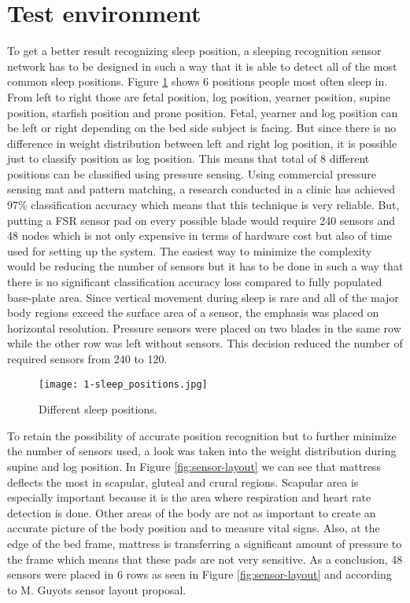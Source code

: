 \section{Test environment}
\label{ssec:test_environment}

To get a better result recognizing sleep position, a sleeping recognition sensor network has to be designed in such a way that it is able to detect all of the most common sleep positions. Figure \ref{fig:sleep_positions} shows 6 positions people most often sleep in. From left to right those are fetal position, log position, yearner position, supine position, starfish position and prone position. Fetal, yearner and log position can be left or right depending on the bed side subject is facing. But since there is no difference in weight distribution between left and right log position, it is possible just to classify position as log position. This means that total of 8 different positions can be classified using pressure sensing. Using commercial pressure sensing mat and pattern matching, a research conducted in a clinic has achieved 97\% classification accuracy\cite{postures} which means that this technique is very reliable. But, putting a \ac{FSR} sensor pad on every possible blade would require 240 sensors and 48 nodes which is not only expensive in terms of hardware cost but also of time used for setting up the system. The easiest way to minimize the complexity would be reducing the number of sensors but it has to be done in such a way that there is no significant classification accuracy loss compared to fully populated base-plate area. Since vertical movement during sleep is rare and all of the major body regions exceed the surface area of a sensor, the emphasis was placed on horizontal resolution. Pressure sensors were placed on two blades in the same row while the other row was left without sensors. This decision reduced the number of required sensors from 240 to 120.

\begin{figure}[h]
  \begin{center}
    \texttt{[image: 1-sleep\_positions.jpg]}
  \end{center}
  \caption{Different sleep positions.}
  \label{fig:sleep_positions}
\end{figure}

To retain the possibility of accurate position recognition but to further minimize the number of sensors used, a look was taken into the weight distribution during supine and log position. In Figure \ref{fig:sensor-layout} we can see that mattress deflects the most in scapular, gluteal and crural regions. Scapular area is especially important because it is the area where respiration and heart rate detection is done. Other areas of the body are not as important to create an accurate picture of the body position and to measure vital signs. Also, at the edge of the bed frame, mattress is transferring a significant amount of pressure to the frame which means that these pads are not very sensitive. As a conclusion, 48 sensors were placed in 6 rows as seen in Figure \ref{fig:sensor-layout} and according to M. Guyots\cite{Guyot} sensor layout proposal.

